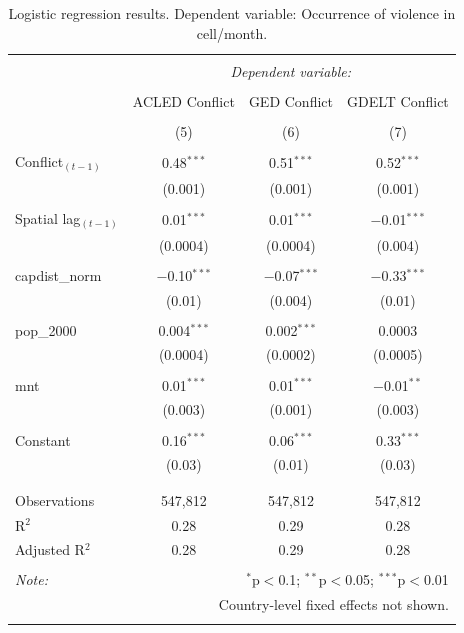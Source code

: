 \documentclass[hidelinks]{article}
\begin{document}
\begin{table}[!htbp] \centering 
\begin{tabular}{@{\extracolsep{5pt}}lccc} 
\\[-1.8ex]\hline 
\hline \\[-1.8ex] 
 & \multicolumn{3}{c}{\textit{Dependent variable:}} \\ 
\cline{2-4} 
\\[-1.8ex] & ACLED Conflict & GED Conflict & GDELT Conflict \\ 
\\[-1.8ex] & (5) & (6) & (7)\\ 
\hline \\[-1.8ex] 
 Conflict$_{(t-1)}$ & 0.48$^{***}$ & 0.51$^{***}$ & 0.52$^{***}$ \\ 
  & (0.001) & (0.001)  & (0.001) \\ 
  & & & \\ 
 Spatial lag$_{(t-1)}$ & 0.01$^{***}$ & 0.01$^{***}$ & $-$0.01$^{***}$ \\ 
  & (0.0004) & (0.0004) & (0.004) \\ 
  & & & \\ 
 capdist\_norm & $-$0.10$^{***}$ & $-$0.07$^{***}$ & $-$0.33$^{***}$ \\ 
  & (0.01) & (0.004) & (0.01) \\ 
  & & & \\ 
 pop\_2000 & 0.004$^{***}$ & 0.002$^{***}$ & 0.0003 \\ 
  & (0.0004) & (0.0002) & (0.0005) \\ 
  & & & \\ 
 mnt & 0.01$^{***}$ & 0.01$^{***}$ & $-$0.01$^{**}$ \\ 
  & (0.003) & (0.001) & (0.003) \\ 
  & & & \\ 
 Constant & 0.16$^{***}$ & 0.06$^{***}$ & 0.33$^{***}$ \\ 
  & (0.03) & (0.01) & (0.03) \\ 
  & & & \\ 
\hline \\[-1.8ex] 
Observations & 547,812 & 547,812 & 547,812 \\ 
R$^{2}$ & 0.28 & 0.29 & 0.28 \\ 
Adjusted R$^{2}$ & 0.28 & 0.29 & 0.28 \\ 
\hline 
\hline \\[-1.8ex] 
\textit{Note:}  & \multicolumn{3}{r}{$^{*}$p$<$0.1; $^{**}$p$<$0.05; $^{***}$p$<$0.01} \\ 
			& \multicolumn{3}{r}{Country-level fixed effects not shown.} \\ 
\normalsize 
\end{tabular} 
  \caption{Logistic regression results. Dependent variable: Occurrence of violence in cell/month.} \label{tab:regression2} 

\end{table} 
\end{document}
